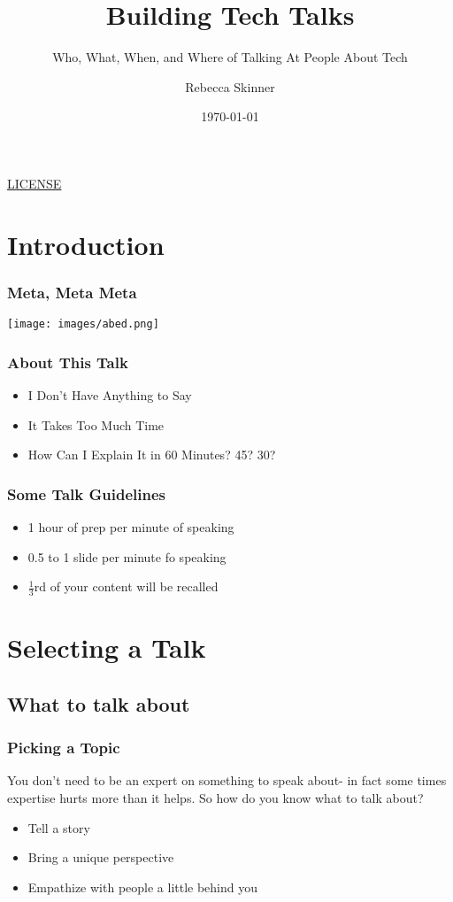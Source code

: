 \documentclass{beamer}
\title{Building Tech Talks}
\subtitle{Who, What, When, and Where of Talking At People About Tech}
\author{Rebecca Skinner}
\institute{Rackspace Hosting}
\date{\today}
\newcommand{\chref}[3] {
  {\color{#1} \href{#2}{\underline{#3}}}
}
\begin{document}
\begin{frame}
  \titlepage{}
  \begin{center}
    \small{\chref{blue}{http://creativecommons.org/licenses/by-sa/4.0/}{LICENSE}}
  \end{center}
\end{frame}

\section{Introduction}
\begin{frame}
  \frametitle{Meta, Meta Meta}
  \texttt{[image: images/abed.png]}
\end{frame}
\begin{frame}
  \frametitle{About This Talk}
  \begin{itemize}
  \item I Don't Have Anything to Say
  \item It Takes Too Much Time
  \item How Can I Explain It in 60 Minutes? 45? 30?
  \end{itemize}
\end{frame}
\begin{frame}[fragile]
  \frametitle{Some Talk Guidelines}
  \begin{itemize}
  \item 1 hour of prep per minute of speaking
  \item 0.5 to 1 slide per minute fo speaking
  \item $\frac{1}{3}$rd of your content will be recalled
  \end{itemize}
\end{frame}

\section{Selecting a Talk}

\subsection{What to talk about}
\begin{frame}
  \frametitle{Picking a Topic}
  You don't need to be an expert on something to speak about- in fact
  some times expertise hurts more than it helps.  So how do you know
  what to talk about?
  \begin{itemize}
  \item Tell a story
  \item Bring a unique perspective
  \item Empathize with people a little behind you
  \end{itemize}
\end{frame}
\end{document}
